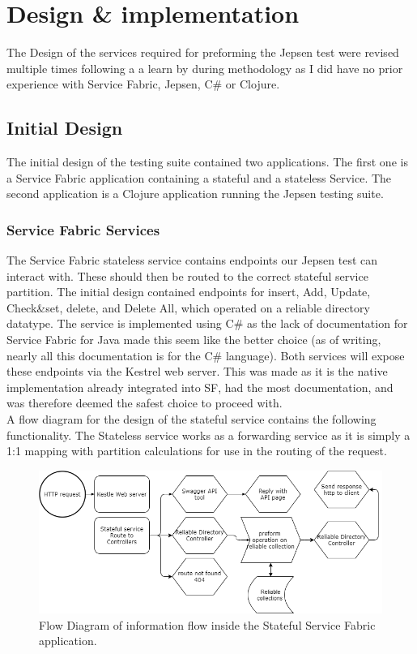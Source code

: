 \documentclass[a4paper,10pt,titlepage]{report}
\begin{document}
    \section{Design \& implementation}
    The Design of the services required for preforming the Jepsen test were revised multiple times following a a learn by during methodology as I did have no prior experience with Service Fabric, Jepsen, C\# or Clojure. 

    \subsection{Initial Design}

    The initial design of the testing suite contained two applications. The first one is a Service Fabric application containing a stateful and a stateless Service. The second application is a Clojure application running the Jepsen testing suite.

    \subsubsection{Service Fabric Services}

    The Service Fabric stateless service contains endpoints our Jepsen test can interact with. These should then be routed to the correct stateful service partition. The initial design contained endpoints for insert, Add, Update, Check\&set, delete, and Delete All, which operated on a reliable directory datatype. The service is implemented using C\# as the lack of documentation for Service Fabric for Java made this seem like the better choice (as of writing, nearly all this documentation is for the C\# language). Both services will expose these endpoints via the Kestrel web server. This was made as it is the native implementation already integrated into SF, had the most documentation, and was therefore deemed the safest choice to proceed with.\\
    \vspace{5mm}
    A flow diagram for the design of the stateful service contains the following functionality. The Stateless service works as a forwarding service as it is simply a 1:1 mapping with partition calculations for use in the routing of the request. \\
    \vspace{5mm}
    \begin{figure}[h!]
        \centering
            \includegraphics[scale=0.5]{images/Design_Stateful_service_1.0.drawio.png}
        \caption{Flow Diagram of information flow inside the Stateful Service Fabric application.}
    \end{figure}
\end{document}
